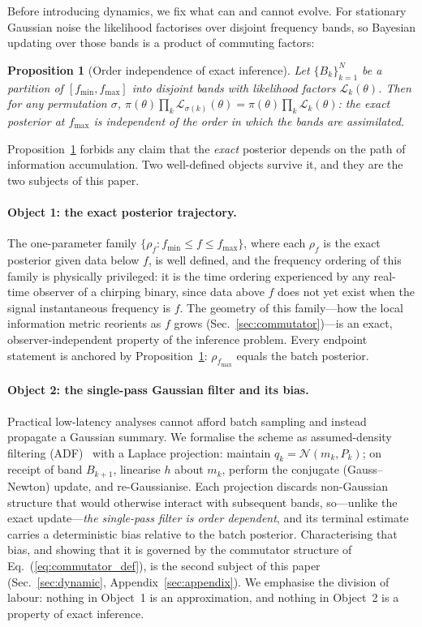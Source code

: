 \documentclass[twocolumn,prd,showpacs,superscriptaddress]{revtex4-2}
\newtheorem{proposition}{Proposition}
\newcommand{\fmin}{f_{\text{min}}}
\newcommand{\fmax}{f_{\text{max}}}
\newcommand{\secref}[1]{Sec.~\ref{sec:#1}}
\newcommand{\eqnref}[1]{Eq.~(\ref{eq:#1})}
\begin{document}
Before introducing dynamics, we fix what can and cannot evolve. For stationary Gaussian noise the likelihood factorises over disjoint frequency bands, so Bayesian updating over those bands is a product of commuting factors:

\begin{proposition}[Order independence of exact inference]
\label{prop:exact}
Let $\{B_k\}_{k=1}^{N}$ be a partition of $[\fmin,\fmax]$ into disjoint bands with likelihood factors $\mathcal{L}_k(\theta)$. Then for any permutation $\sigma$,
$\pi(\theta)\prod_k \mathcal{L}_{\sigma(k)}(\theta)
= \pi(\theta)\prod_k \mathcal{L}_{k}(\theta)$:
the exact posterior at $\fmax$ is independent of the order in which the bands are assimilated.
\end{proposition}

Proposition~\ref{prop:exact} forbids any claim that the \emph{exact} posterior depends on the path of information accumulation. Two well-defined objects survive it, and they are the two subjects of this paper.

\paragraph{Object 1: the exact posterior trajectory.}
The one-parameter family $\{\rho_f : \fmin \le f \le \fmax\}$, where each $\rho_f$ is the exact posterior given data below $f$, is well defined, and the frequency ordering of this family is physically privileged: it is the time ordering experienced by any real-time observer of a chirping binary, since data above $f$ does not yet exist when the signal instantaneous frequency is $f$. The geometry of this family---how the local information metric reorients as $f$ grows (\secref{commutator})---is an exact, observer-independent property of the inference problem. Every endpoint statement is anchored by Proposition~\ref{prop:exact}: $\rho_{\fmax}$ equals the batch posterior.

\paragraph{Object 2: the single-pass Gaussian filter and its bias.}
Practical low-latency analyses cannot afford batch sampling and instead propagate a Gaussian summary. We formalise the scheme as assumed-density filtering (ADF)~\cite{minka2001ep,opper1998online} with a Laplace projection: maintain $q_k = \mathcal{N}(m_k, P_k)$; on receipt of band $B_{k+1}$, linearise $h$ about $m_k$, perform the conjugate (Gauss--Newton) update, and re-Gaussianise. Each projection discards non-Gaussian structure that would otherwise interact with subsequent bands, so---unlike the exact update---\emph{the single-pass filter is order dependent}, and its terminal estimate carries a deterministic bias relative to the batch posterior. Characterising that bias, and showing that it is governed by the commutator structure of \eqnref{commutator_def}, is the second subject of this paper (\secref{dynamic}, Appendix~\ref{sec:appendix}). We emphasise the division of labour: nothing in Object~1 is an approximation, and nothing in Object~2 is a property of exact inference.
\end{document}
